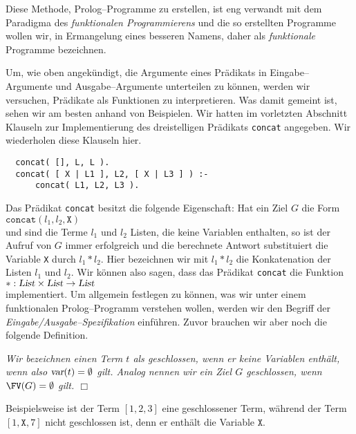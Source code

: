 Diese Methode, Prolog--Programme zu erstellen, ist eng verwandt mit dem Paradigma des \emph{funktionalen Programmierens}
und die so erstellten Programme wollen wir, in Ermangelung eines besseren Namens, daher als \emph{funktionale} Programme
bezeichnen.  

Um, wie oben angek\"{u}ndigt, die Argumente eines Pr\"{a}dikats in Eingabe--Argumente und Ausgabe--Argumente
unterteilen zu k\"{o}nnen, werden wir versuchen, Pr\"{a}dikate als
Funktionen zu interpretieren.  Was damit gemeint ist, sehen wir am besten anhand von
Beispielen.  Wir hatten im vorletzten Abschnitt Klauseln zur Implementierung des dreistelligen
Pr\"{a}dikats \texttt{concat}
angegeben.  Wir wiederholen diese Klauseln hier.
\begin{verbatim}
  concat( [], L, L ).
  concat( [ X | L1 ], L2, [ X | L3 ] ) :- 
      concat( L1, L2, L3 ).
\end{verbatim}
Das Pr\"{a}dikat \texttt{concat} besitzt die folgende Eigenschaft:  Hat ein Ziel $G$ die Form\\[0.1cm]
\hspace*{1.3cm} $\texttt{concat}(l_1,l_2, \texttt{X})$ \\[0.1cm]
und sind die Terme $l_1$ und $l_2$ Listen, die keine Variablen enthalten, so ist der
Aufruf von $G$ immer erfolgreich und die berechnete Antwort substituiert die Variable
\texttt{X} durch $l_1 * l_2$.  Hier bezeichnen wir mit $l_1 * l_2$ die Konkatenation der
Listen $l_1$ und $l_2$.  Wir k\"{o}nnen also sagen, dass das Pr\"{a}dikat \texttt{concat} die
Funktion \\[0.1cm]
\hspace*{1.3cm} $*: \textsl{List} \times \textsl{List} \rightarrow \textsl{List}$ \\[0.1cm]
implementiert.  Um allgemein festlegen zu k\"{o}nnen, was wir unter einem funktionalen
Prolog--Programm verstehen wollen, werden wir den Begriff der
\emph{Eingabe/Ausgabe--Spezifikation} einf\"{u}hren.  Zuvor brauchen wir aber noch die folgende Definition.

\begin{Definition}
{\em
   Wir bezeichnen einen Term $t$ als \emph{geschlossen}, wenn er keine Variablen enth\"{a}lt, wenn also 
   $\textsl{var}(t) = \emptyset$ gilt.   Analog nennen wir ein Ziel $G$
    \emph{geschlossen}, wenn $\FV(G) = \emptyset$ gilt.
   \hspace*{\fill} $\Box$
}
\end{Definition}
Beispielsweise ist der Term $[1,2,3]$ eine geschlossener Term, w\"{a}hrend  der Term $[1,\mathtt{X},7]$ nicht geschlossen ist, denn er
enth\"{a}lt die Variable $\mathtt{X}$.

